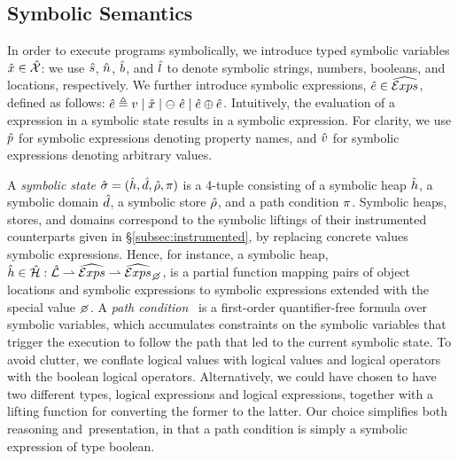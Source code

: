 \subsection{Symbolic Semantics}\label{subsec:symb:semantics}
In order to execute \jsil programs symbolically, we introduce typed symbolic variables $\hat{x} \in \hat{\mathcal{X}}$: 
we use $\hat{s}$, $\hat{n}$, $\hat{b}$, and $\hat{l}$ to denote symbolic strings, numbers, 
booleans, and locations, respectively. We further introduce symbolic expressions, $\hat{e} \in \widehat{\text{$\mathcal{E}xps$}}$, defined as follows: 
$\hat{e} \triangleq v \mid \hat{x} \mid \ominus\ \hat{e} \mid \hat{e} \oplus \hat{e}$. 
Intuitively, the evaluation of a \jsil expression in a symbolic state results in a symbolic expression. 
For clarity, we use $\hat{p}$ for symbolic expressions denoting property names, and $\hat{v}$ for symbolic
expressions denoting arbitrary values. 


A \emph{symbolic state} $\hat{\sigma} = (\hat{h}, \hat{d}, \hat\rho, \pi)$ is a 4-tuple consisting of a 
symbolic heap $\hat{h}$, a symbolic domain $\hat{d}$, a symbolic store $\hat\rho$, and a path condition $\pi$. 
Symbolic heaps, stores, and domains correspond to the symbolic liftings of their instrumented 
counterparts given in \S\ref{subsec:instrumented}, by replacing concrete values symbolic expressions. 
Hence, for instance, a symbolic heap, $\sheap \in \sheaps : \slocs \partialmap \sexprs \partialmap \setext{\sexprs}{\none}$,
is a partial function mapping pairs of object locations and symbolic expressions to symbolic expressions
extended with the special value $\none$. 
A \emph{path condition}~\cite{symb:exec:survey} is a first-order quantifier-free formula over symbolic variables, 
which accumulates constraints on the symbolic variables that trigger 
the execution to follow the path that led to the current symbolic state.
To avoid clutter, we conflate logical values with \jsil logical values and \jsil logical 
operators with the boolean logical operators. Alternatively, we could have chosen to 
have two different types, \jsil logical expressions and logical expressions, together with a lifting 
function for converting the former to the latter. Our choice simplifies both reasoning 
and~presentation, in that a path condition is simply a \jsil symbolic expression of type boolean. 

